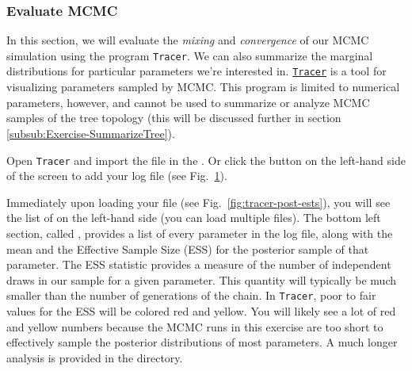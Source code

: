 
\medskip
\subsubsection{Evaluate MCMC}\label{subsub:Exercise-EvalMCMC}

In this section, we will evaluate the \textit{mixing} and \textit{convergence} of our MCMC simulation using the program {\tt Tracer}.
We can also summarize the marginal distributions for particular parameters we're interested in.
\href{http://tree.bio.ed.ac.uk/software/tracer/}{\tt Tracer} \citep{Rambaut2011} is a tool for visualizing parameters sampled by MCMC.
This program is limited to numerical parameters, however, and cannot be used to summarize or analyze MCMC samples of the tree topology (this will be discussed further in section \ref{subsub:Exercise-SummarizeTree}).

\begin{framed}
Open {\tt Tracer} and import the  file in the .
Or click the \fbox{$+$} button on the left-hand side of the screen to add your log file (see Fig.\ \ref{fig:tracer}).
\end{framed}


\begin{figure}[h!]
\label{fig:tracer}
\end{figure}

Immediately upon loading your file (see Fig.\ \ref{fig:tracer-post-ests}), 
you will see the list of  on the left-hand side (you can load multiple files).
The bottom left section, called , provides a list of every parameter in the log file, along with the mean and the Effective Sample Size (ESS) for the posterior sample of that parameter.
The ESS statistic provides a measure of the number of independent draws in our sample for a given parameter.
This quantity will typically be much smaller than the number of generations of the chain.
In {\tt Tracer}, poor to fair values for the ESS will be colored red and yellow.
You will likely see a lot of red and yellow numbers because the MCMC runs in this exercise are too short to effectively sample the posterior distributions of most parameters.
A much longer analysis is provided in the  directory. 

